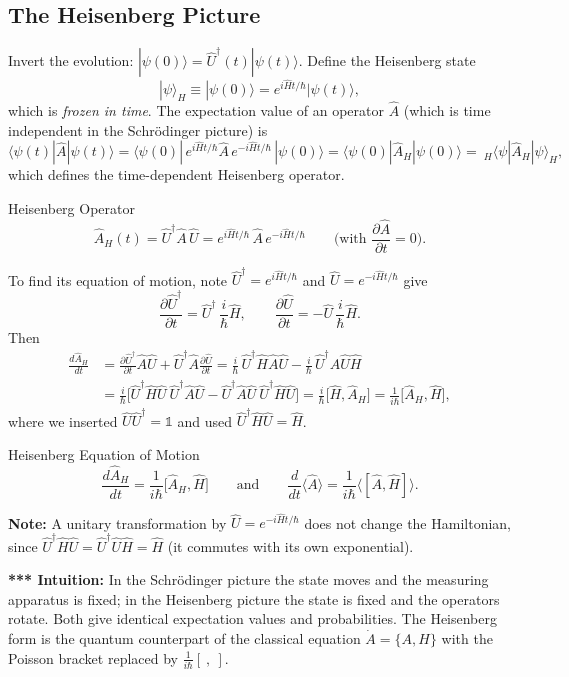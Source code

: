 \documentclass[11pt,a4paper]{article}
\begin{document}
\subsection{The Heisenberg Picture}
Invert the evolution: $|\psi(0)\rangle=\hat U^\dagger(t)|\psi(t)\rangle$. Define the Heisenberg state
\[
|\psi\rangle_H\equiv|\psi(0)\rangle=e^{i\hat Ht/\hbar}|\psi(t)\rangle ,
\]
which is \emph{frozen in time}. The expectation value of an operator $\hat A$ (which is time independent in the Schr\"odinger picture) is
\[
\langle\psi(t)|\hat A|\psi(t)\rangle=\langle\psi(0)|\,e^{i\hat Ht/\hbar}\hat A\,e^{-i\hat Ht/\hbar}\,|\psi(0)\rangle=\langle\psi(0)|\hat A_H|\psi(0)\rangle=\ _H\langle\psi|\hat A_H|\psi\rangle_H ,
\]
which defines the time-dependent Heisenberg operator.
\begin{thm}{Heisenberg Operator}
\[
\hat A_H(t)=\hat U^\dagger\hat A\,\hat U=e^{i\hat Ht/\hbar}\,\hat A\,e^{-i\hat Ht/\hbar}\qquad\Big(\text{with }\frac{\partial\hat A}{\partial t}=0\Big).
\]
\end{thm}
To find its equation of motion, note $\hat U^\dagger=e^{i\hat Ht/\hbar}$ and $\hat U=e^{-i\hat Ht/\hbar}$ give
\[
\frac{\partial\hat U^\dagger}{\partial t}=\hat U^\dagger\,\frac i\hbar\hat H,\qquad
\frac{\partial\hat U}{\partial t}=-\hat U\,\frac i\hbar\hat H .
\]
Then
\begin{align*}
\frac{d\hat A_H}{dt}&=\frac{\partial\hat U^\dagger}{\partial t}\hat A\hat U+\hat U^\dagger\hat A\frac{\partial\hat U}{\partial t}
=\frac i\hbar\,\hat U^\dagger\hat H\hat A\hat U-\frac i\hbar\,\hat U^\dagger\hat A\hat U\hat H\\
&=\frac i\hbar\Big[\hat U^\dagger\hat H\hat U\ \hat U^\dagger\hat A\hat U-\hat U^\dagger\hat A\hat U\ \hat U^\dagger\hat H\hat U\Big]
=\frac i\hbar\big[\hat H,\hat A_H\big]=\frac1{i\hbar}\big[\hat A_H,\hat H\big],
\end{align*}
where we inserted $\hat U\hat U^\dagger=\mathbb 1$ and used $\hat U^\dagger\hat H\hat U=\hat H$.
\begin{thm}{Heisenberg Equation of Motion}
\[
\frac{d\hat A_H}{dt}=\frac1{i\hbar}\big[\hat A_H,\hat H\big]\qquad\text{and}\qquad\frac d{dt}\langle\hat A\rangle=\frac1{i\hbar}\big\langle[\hat A,\hat H]\big\rangle .
\]
\end{thm}
\textbf{Note:} A unitary transformation by $\hat U=e^{-i\hat Ht/\hbar}$ does not change the Hamiltonian, since $\hat U^\dagger\hat H\hat U=\hat U^\dagger\hat U\hat H=\hat H$ (it commutes with its own exponential).

\textbf{*** Intuition:} In the Schr\"odinger picture the state moves and the measuring apparatus is fixed; in the Heisenberg picture the state is fixed and the operators rotate. Both give identical expectation values and probabilities. The Heisenberg form is the quantum counterpart of the classical equation $\dot A=\{A,H\}$ with the Poisson bracket replaced by $\frac1{i\hbar}[\ ,\ ]$.
\end{document}
